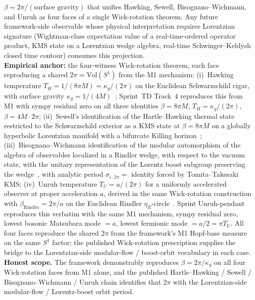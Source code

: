 \documentclass[11pt]{article}
\begin{document}
$\beta = 2\pi / (\text{surface gravity})$ that unifies Hawking,
Sewell, Bisognano--Wichmann, and Unruh as four faces of a single
Wick-rotation theorem.  Any future framework-side observable whose
physical interpretation requires Lorentzian signature (Wightman-class
expectation value of a real-time-ordered operator product, KMS state
on a Lorentzian wedge algebra, real-time Schwinger--Keldysh closed
time contour) consumes this projection.\\
\textbf{Empirical anchor:} the four-witness Wick-rotation theorem,
each face reproducing a shared $2\pi = \mathrm{Vol}(S^1)$ from the
M1 mechanism:
(i)~Hawking temperature $T_H = 1/(8\pi M) = \kappa_g / (2\pi)$ on the
Euclidean Schwarzschild cigar, with surface gravity
$\kappa_g = 1/(4M)$~\cite{hartle_hawking1976};
Sprint~TD Track~4 reproduces this from M1 with sympy residual zero
on all three identities $\beta = 8\pi M$, $T_H = \kappa_g/(2\pi)$,
$\beta = 4M \cdot 2\pi$;
(ii)~Sewell's identification of the Hartle--Hawking thermal state
restricted to the Schwarzschild exterior as a KMS state at
$\beta = 8\pi M$ on a globally hyperbolic Lorentzian manifold with
a bifurcate Killing horizon~\cite{sewell1982};
(iii)~Bisognano--Wichmann identification of the modular automorphism
of the algebra of observables localized in a Rindler wedge, with
respect to the vacuum state, with the unitary representation of the
Lorentz boost subgroup preserving the
wedge~\cite{bisognano_wichmann1976}, with analytic period
$\sigma_{i \cdot 2\pi} = $ identity forced by Tomita--Takesaki KMS;
(iv)~Unruh temperature $T_U = a / (2\pi)$ for a uniformly accelerated
observer at proper acceleration $a$, derived in the same Wick-rotation
construction with $\beta_{\mathrm{Rindler}} = 2\pi / a$ on the
Euclidean Rindler $\eta_E$-circle~\cite{unruh1976}.  Sprint
Unruh-pendant reproduces this verbatim with the same M1 mechanism,
sympy residual zero, lowest bosonic Matsubara mode $= a$, lowest
fermionic mode $= a/2 = \pi T_U$.
All four faces reproduce the shared $2\pi$ from the framework's
M1 Hopf-base measure on the same $S^1$ factor; the published
Wick-rotation prescription supplies the bridge to the Lorentzian-side
modular-flow / boost-orbit vocabulary in each case.\\
\textbf{Honest scope.}  The framework demonstrably reproduces
$\beta = 2\pi / \kappa_g$ on all four Wick-rotation faces from M1
alone, and the published Hartle--Hawking / Sewell / Bisognano--Wichmann
/ Unruh chain identifies that $2\pi$ with the Lorentzian-side
modular-flow / Lorentz-boost orbit period.
\end{document}

